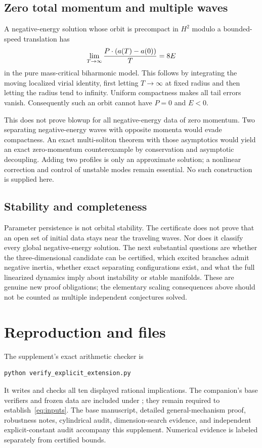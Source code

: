 \documentclass[11pt,a4paper]{article}
\theoremstyle{remark}\newtheorem{remark}[theorem]{Remark}
\begin{document}
\subsection{Zero total momentum and multiple waves}
A negative-energy solution whose orbit is precompact in $H^2$ modulo a bounded-speed translation has
\[
 \lim_{T\to\infty}{P\cdot(a(T)-a(0))\over T}=8E
\]
in the pure mass-critical biharmonic model. This follows by integrating the moving localized virial identity, first letting $T\to\infty$ at fixed radius and then letting the radius tend to infinity. Uniform compactness makes all tail errors vanish. Consequently such an orbit cannot have $P=0$ and $E<0$.

This does not prove blowup for all negative-energy data of zero momentum. Two separating negative-energy waves with opposite momenta would evade compactness. An exact multi-soliton theorem with those asymptotics would yield an exact zero-momentum counterexample by conservation and asymptotic decoupling. Adding two profiles is only an approximate solution; a nonlinear correction and control of unstable modes remain essential. No such construction is supplied here.

\subsection{Stability and completeness}
Parameter persistence is not orbital stability. The certificate does not prove that an open set of initial data stays near the traveling waves. Nor does it classify every global negative-energy solution. The next substantial questions are whether the three-dimensional candidate can be certified, which excited branches admit negative inertia, whether exact separating configurations exist, and what the full linearized dynamics imply about instability or stable manifolds. These are genuine new proof obligations; the elementary scaling consequences above should not be counted as multiple independent conjectures solved.

\section{Reproduction and files}
The supplement's exact arithmetic checker is
\begin{verbatim}
python verify_explicit_extension.py
\end{verbatim}
It writes  and checks all ten displayed rational implications. The companion's base verifiers and frozen data are included under ; they remain required to establish~\eqref{eq:inputs}. The base manuscript, detailed general-mechanism proof, robustness notes, cylindrical audit, dimension-search evidence, and independent explicit-constant audit accompany this supplement. Numerical evidence is labeled separately from certified bounds.
\end{document}
